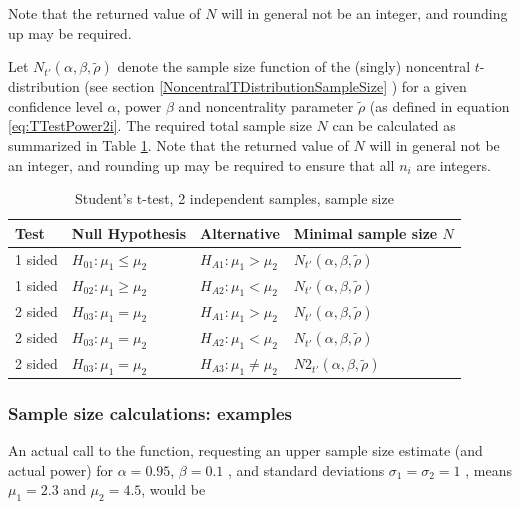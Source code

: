 Note that the returned value of $N$ will in general not be an integer, and rounding up may be required.


Let $N_{t'}\left(\alpha, \beta, \widetilde{\rho} \right)$ denote the sample size function of the (singly) noncentral $t$-distribution (see section \ref{NoncentralTDistributionSampleSize} ) for a given confidence level $\alpha$, power $\beta$ and noncentrality parameter $\widetilde{\rho}$ (as defined in equation \ref{eq:TTestPower2i}. The required total sample size $N$ can be calculated as summarized in Table \ref{TableStudentsttest,2i samples,sample size}. Note that the returned value of $N$ will in general not be an integer, and rounding up may be required to ensure that all $n_i$ are integers.


\begin{table}[ht]
	\centering
	\begin{tabular}{|l|l|l|l|}
		\hline
		Test &Null Hypothesis &Alternative & Minimal sample size $N$ \\
		\hline
		1 sided & $H_{01}: \mu_1 \leq \mu_2$ & $H_{A1}: \mu_1 > \mu_2$ & $N_{t'}\left(\alpha, \beta, \widetilde{\rho} \right)$ \\
		1 sided & $H_{02}: \mu_1 \geq \mu_2$ & $H_{A2}: \mu_1 < \mu_2$ & $N_{t'}\left(\alpha, \beta, \widetilde{\rho} \right)$  \\
		\hline
		2 sided & $H_{03}: \mu_1 = \mu_2$ & $H_{A1}: \mu_1 > \mu_2$ & $N_{t'}\left(\alpha, \beta, \widetilde{\rho} \right)$ \\
		2 sided & $H_{03}: \mu_1 = \mu_2$ & $H_{A2}: \mu_1 < \mu_2$ & $N_{t'}\left(\alpha, \beta, \widetilde{\rho} \right)$  \\
		2 sided & $H_{03}: \mu_1 = \mu_2$ & $H_{A3}: \mu_1 \neq \mu_2$ & $N2_{t'}\left(\alpha, \beta, \widetilde{\rho} \right)$ \\
		\hline
	\end{tabular}
	\caption{Student's t-test, 2 independent samples, sample size}
	\label{TableStudentsttest,2i samples,sample size}
\end{table}





\subsubsection{Sample size calculations: examples}
An actual call to the function, requesting an upper sample size estimate (and actual power) for $\alpha = 0.95$, $\beta=0.1$ , and standard deviations $\sigma_1=\sigma_2=1$ , means $\mu_1=2.3$ and $\mu_2=4.5$,   would be

